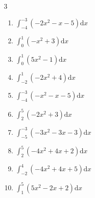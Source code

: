 \begin{multicols}{3}
\begin{enumerate}

  \item $\displaystyle \int_{-4}^{-3}\left( -2x^{2}-x-5 \right) \mathrm{d}x$

        \phantom{$\displaystyle =-22$}

\columnbreak %

\resetques

  \item $\displaystyle \int_{0}^{1}\left( -x^{2}+3 \right) \mathrm{d}x$


  \item $\displaystyle \int_{0}^{1}\left( 5x^{2}-1 \right) \mathrm{d}x$


  \item $\displaystyle \int_{-2}^{1}\left( -2x^{2}+4 \right) \mathrm{d}x$

        \phantom{$\displaystyle =-4$}

  \item $\displaystyle \int_{-4}^{-3}\left( -x^{2}-x-5 \right) \mathrm{d}x$


  \item $\displaystyle \int_{2}^{5}\left( -2x^{2}+3 \right) \mathrm{d}x$


\columnbreak %

  \item $\displaystyle \int_{-5}^{-3}\left( -3x^{2}-3x-3 \right) \mathrm{d}x$

        \phantom{$\displaystyle =-75$}

  \item $\displaystyle \int_{2}^{5}\left( -4x^{2}+4x+2 \right) \mathrm{d}x$

        \phantom{$\displaystyle =-113$}

  \item $\displaystyle \int_{-2}^{4}\left( -4x^{2}+4x+5 \right) \mathrm{d}x$

        \phantom{$\displaystyle =-67$}

  \item $\displaystyle \int_{1}^{5}\left( 5x^{2}-2x+2 \right) \mathrm{d}x$

        \phantom{$\displaystyle =184$}


\end{enumerate}
\end{multicols}
